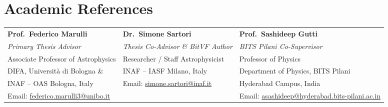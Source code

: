 \documentclass[10pt,a4paper]{article}
\begin{document}
\section{Academic References}

\begin{tabularx}{\textwidth}{@{}XXX@{}}
    \textbf{Prof.\ Federico Marulli} & \textbf{Dr.\ Simone Sartori} & \textbf{Prof.\ Sashideep Gutti} \\
    \textit{Primary Thesis Advisor} & \textit{Thesis Co-Advisor \& BitVF Author} & \textit{BITS Pilani Co-Supervisor} \\
    Associate Professor of Astrophysics & Researcher / Staff Astrophysicist & Professor of Physics \\
    DIFA, Università di Bologna \& & INAF -- IASF Milano, Italy & Department of Physics, BITS Pilani \\
    INAF -- OAS Bologna, Italy & Email: \href{mailto:simone.sartori@inaf.it}{simone.sartori@inaf.it} & Hyderabad Campus, India \\
    Email: \href{mailto:federico.marulli3@unibo.it}{federico.marulli3@unibo.it} & & Email: \href{mailto:asashideep@hyderabad.bits-pilani.ac.in}{asashideep@hyderabad.bits-pilani.ac.in}
\end{tabularx}
\end{document}
